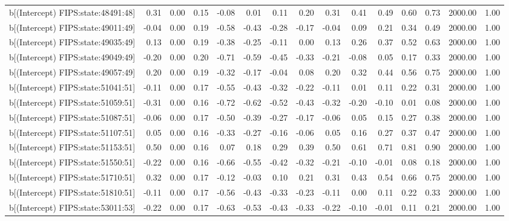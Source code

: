 \begin{table}[ht]
\begin{tabular}{rrrrrrrrrrrrrrr}
  b[(Intercept) FIPS:state:48491:48] & 0.31 & 0.00 & 0.15 & -0.08 & 0.01 & 0.11 & 0.20 & 0.31 & 0.41 & 0.49 & 0.60 & 0.73 & 2000.00 & 1.00 \\ 
  b[(Intercept) FIPS:state:49011:49] & -0.04 & 0.00 & 0.19 & -0.58 & -0.43 & -0.28 & -0.17 & -0.04 & 0.09 & 0.21 & 0.34 & 0.49 & 2000.00 & 1.00 \\ 
  b[(Intercept) FIPS:state:49035:49] & 0.13 & 0.00 & 0.19 & -0.38 & -0.25 & -0.11 & 0.00 & 0.13 & 0.26 & 0.37 & 0.52 & 0.63 & 2000.00 & 1.00 \\ 
  b[(Intercept) FIPS:state:49049:49] & -0.20 & 0.00 & 0.20 & -0.71 & -0.59 & -0.45 & -0.33 & -0.21 & -0.08 & 0.05 & 0.17 & 0.33 & 2000.00 & 1.00 \\ 
  b[(Intercept) FIPS:state:49057:49] & 0.20 & 0.00 & 0.19 & -0.32 & -0.17 & -0.04 & 0.08 & 0.20 & 0.32 & 0.44 & 0.56 & 0.75 & 2000.00 & 1.00 \\ 
  b[(Intercept) FIPS:state:51041:51] & -0.11 & 0.00 & 0.17 & -0.55 & -0.43 & -0.32 & -0.22 & -0.11 & 0.01 & 0.11 & 0.22 & 0.31 & 2000.00 & 1.00 \\ 
  b[(Intercept) FIPS:state:51059:51] & -0.31 & 0.00 & 0.16 & -0.72 & -0.62 & -0.52 & -0.43 & -0.32 & -0.20 & -0.10 & 0.01 & 0.08 & 2000.00 & 1.00 \\ 
  b[(Intercept) FIPS:state:51087:51] & -0.06 & 0.00 & 0.17 & -0.50 & -0.39 & -0.27 & -0.17 & -0.06 & 0.05 & 0.15 & 0.27 & 0.38 & 2000.00 & 1.00 \\ 
  b[(Intercept) FIPS:state:51107:51] & 0.05 & 0.00 & 0.16 & -0.33 & -0.27 & -0.16 & -0.06 & 0.05 & 0.16 & 0.27 & 0.37 & 0.47 & 2000.00 & 1.00 \\ 
  b[(Intercept) FIPS:state:51153:51] & 0.50 & 0.00 & 0.16 & 0.07 & 0.18 & 0.29 & 0.39 & 0.50 & 0.61 & 0.71 & 0.81 & 0.90 & 2000.00 & 1.00 \\ 
  b[(Intercept) FIPS:state:51550:51] & -0.22 & 0.00 & 0.16 & -0.66 & -0.55 & -0.42 & -0.32 & -0.21 & -0.10 & -0.01 & 0.08 & 0.18 & 2000.00 & 1.00 \\ 
  b[(Intercept) FIPS:state:51710:51] & 0.32 & 0.00 & 0.17 & -0.12 & -0.03 & 0.10 & 0.21 & 0.31 & 0.43 & 0.54 & 0.66 & 0.75 & 2000.00 & 1.00 \\ 
  b[(Intercept) FIPS:state:51810:51] & -0.11 & 0.00 & 0.17 & -0.56 & -0.43 & -0.33 & -0.23 & -0.11 & 0.00 & 0.11 & 0.22 & 0.33 & 2000.00 & 1.00 \\ 
  b[(Intercept) FIPS:state:53011:53] & -0.22 & 0.00 & 0.17 & -0.63 & -0.53 & -0.43 & -0.33 & -0.22 & -0.10 & -0.01 & 0.11 & 0.21 & 2000.00 & 1.00 \\ 

\end{tabular}
\end{table}
